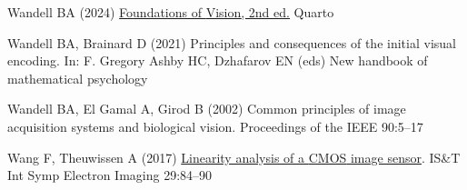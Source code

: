 \documentclass[
  letterpaper,
]{book}
\newlength{\cslhangindent}
\newenvironment{CSLReferences}[2] %
 {\begin{list}{}{%
  \setlength{\itemindent}{0pt}
  \setlength{\leftmargin}{0pt}
  \setlength{\parsep}{0pt}
  \ifodd #1
   \setlength{\leftmargin}{\cslhangindent}
   \setlength{\itemindent}{-1\cslhangindent}
  \fi
  \setlength{\itemsep}{#2\baselineskip}}}
 {\end{list}}
\begin{document}
\begin{CSLReferences}{1}{1}
Wandell BA (2024) \href{https://github.io.fov2024}{Foundations of
{Vision}, 2nd ed.} Quarto

Wandell BA, Brainard D (2021) Principles and consequences of the initial
visual encoding. In: F. Gregory Ashby HC, Dzhafarov EN (eds) New
handbook of mathematical psychology

Wandell BA, El Gamal A, Girod B (2002) Common principles of image
acquisition systems and biological vision. Proceedings of the IEEE
90:5--17

Wang F, Theuwissen A (2017)
\href{http://dx.doi.org/10.2352/issn.2470-1173.2017.11.imse-191}{Linearity
analysis of a {CMOS} image sensor}. IS\&T Int Symp Electron Imaging
29:84--90

\end{CSLReferences}


\backmatter
\end{document}
